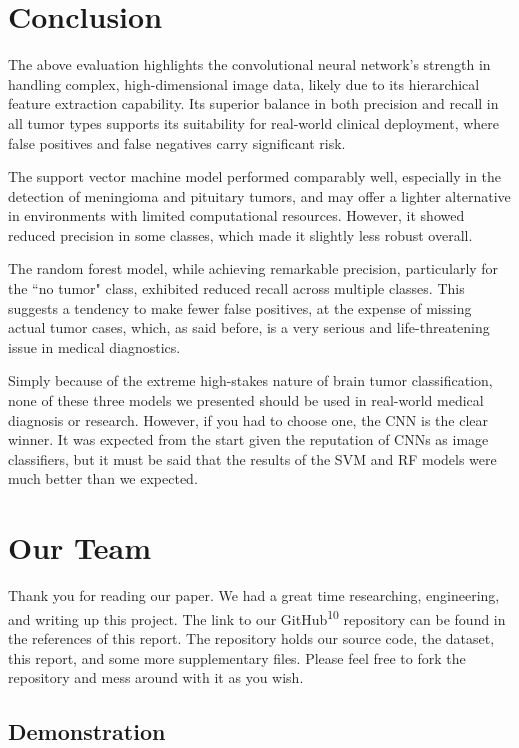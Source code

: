 \documentclass[conference]{IEEEtran}
\begin{document}
\section{\large Conclusion}

The above evaluation highlights the convolutional neural network's strength in handling complex, high-dimensional image data, likely due to its hierarchical feature extraction capability. Its superior balance in both precision and recall in all tumor types supports its suitability for real-world clinical deployment, where false positives and false negatives carry significant risk.

The support vector machine model performed comparably well, especially in the detection of meningioma and pituitary tumors, and may offer a lighter alternative in environments with limited computational resources. However, it showed reduced precision in some classes, which made it slightly less robust overall.

The random forest model, while achieving remarkable precision, particularly for the ``no tumor" class, exhibited reduced recall across multiple classes. This suggests a tendency to make fewer false positives, at the expense of missing actual tumor cases, which, as said before, is a very serious and life-threatening issue in medical diagnostics.

Simply because of the extreme high-stakes nature of brain tumor classification, none of these three models we presented should be used in real-world medical diagnosis or research. However, if you had to choose one, the CNN is the clear winner. It was expected from the start given the reputation of CNNs as image classifiers, but it must be said that the results of the SVM and RF models were much better than we expected.

\section{\large Our Team}

Thank you for reading our paper. We had a great time researching, engineering, and writing up this project. The link to our GitHub\textsuperscript{10} repository can be found in the references of this report. The repository holds our source code, the dataset, this report, and some more supplementary files. Please feel free to fork the repository and mess around with it as you wish.

\subsection{\large Demonstration}
\end{document}
